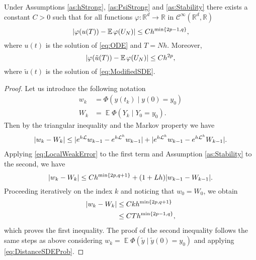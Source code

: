 \documentclass{siamart1116}
\numberwithin{theorem}{section}
\DeclarePairedDelimiter{\abs}{\lvert}{\rvert}
\renewcommand{\phi}{\varphi}
\newcommand{\R}{\mathbb{R}}
\newcommand{\diffL}{\mathcal{L}}
\newcommand{\E}{\operatorname{\mathbb{E}}}
\begin{document}
\begin{theorem}\label{thm:weakOrder} Under Assumptions \ref{as:hStrong}, \ref{as:PsiStrong} and \ref{as:Stability} there exists a constant $C > 0$ such that for all functions $\phi\colon\R^d\to\R$ in $\mathcal{C}^\infty(\R^d,\R)$
	\begin{equation}
		\abs{\phi(u(T)) - \E\phi(U_N)} \leq Ch^{\min\{2p - 1, q\}},
	\end{equation}
	where $u(t)$ is the solution of \eqref{eq:ODE} and $T = Nh$. Moreover, 
	\begin{equation}
		\abs{\phi(\tilde u(T)) - \E\phi(U_N)} \leq Ch^{2p},		
	\end{equation}
	where $\tilde u(t)$ is the solution of \eqref{eq:ModifiedSDE}.
\end{theorem}

\begin{proof} Let us introduce the following notation
	\begin{equation}
	\begin{aligned}
		w_k &= \Phi(y(t_k) \mid y(0) = y_0)\\
		W_k &= \E\Phi(Y_k \mid Y_0 = y_0).
	\end{aligned}
	\end{equation}
	Then by the triangular inequality and the Markov property we have
	\begin{equation}
	\begin{aligned}
		\abs{w_k - W_k} \leq \abs{e^{h\diffL}w_{k-1} - e^{h\diffL^h}w_{k-1}} + \abs{e^{h\diffL^h}w_{k-1} - e^{h\diffL^h}W_{k-1}}.
	\end{aligned}
	\end{equation}
	Applying \eqref{eq:LocalWeakError} to the first term and Assumption \ref{as:Stability} to the second, we have
	\begin{equation}
		\abs{w_k - W_k} \leq Ch^{\min\{2p, q + 1\}} + (1 + Lh)\abs{w_{k-1} - W_{k-1}}.
	\end{equation} 
	Proceeding iteratively on the index $k$ and noticing that $w_0 = W_0$, we obtain
	\begin{equation}
	\begin{aligned}
		\abs{w_k - W_k} &\leq C k h^{\min\{2p, q + 1\}}\\
		&\leq C T h^{\min\{2p - 1, q\}},	
	\end{aligned}
	\end{equation}
	which proves the first inequality. The proof of the second inequality follows the same steps as above considering $w_k = \E\Phi(\tilde y\mid \tilde y(0) = y_0)$ and applying \eqref{eq:DistanceSDEProb}. 
\end{proof}
\end{document}
